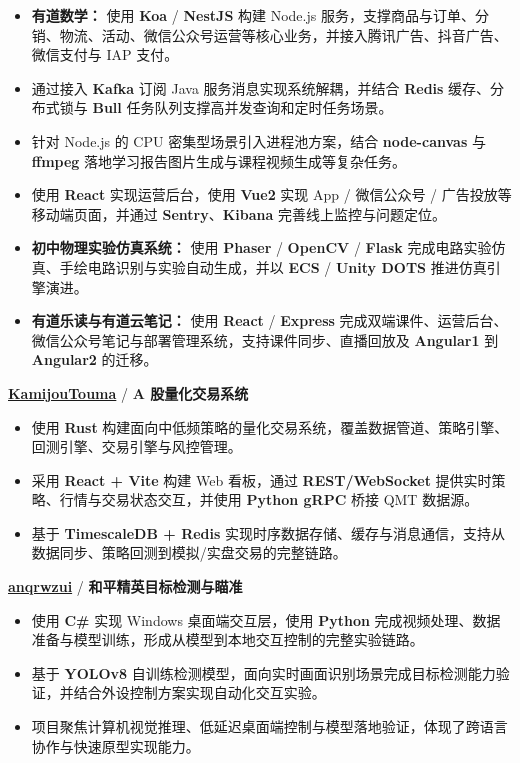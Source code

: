 \begin{itemize}
  \item \textbf{有道数学：} 使用 \textbf{Koa} / \textbf{NestJS} 构建 Node.js 服务，支撑商品与订单、分销、物流、活动、微信公众号运营等核心业务，并接入腾讯广告、抖音广告、微信支付与 IAP 支付。
  \item 通过接入 \textbf{Kafka} 订阅 Java 服务消息实现系统解耦，并结合 \textbf{Redis} 缓存、分布式锁与 \textbf{Bull} 任务队列支撑高并发查询和定时任务场景。
  \item 针对 Node.js 的 CPU 密集型场景引入进程池方案，结合 \textbf{node-canvas} 与 \textbf{ffmpeg} 落地学习报告图片生成与课程视频生成等复杂任务。
  \item 使用 \textbf{React} 实现运营后台，使用 \textbf{Vue2} 实现 App / 微信公众号 / 广告投放等移动端页面，并通过 \textbf{Sentry}、\textbf{Kibana} 完善线上监控与问题定位。
  \item \textbf{初中物理实验仿真系统：} 使用 \textbf{Phaser} / \textbf{OpenCV} / \textbf{Flask} 完成电路实验仿真、手绘电路识别与实验自动生成，并以 \textbf{ECS} / \textbf{Unity DOTS} 推进仿真引擎演进。
  \item \textbf{有道乐读与有道云笔记：} 使用 \textbf{React} / \textbf{Express} 完成双端课件、运营后台、微信公众号笔记与部署管理系统，支持课件同步、直播回放及 \textbf{Angular1} 到 \textbf{Angular2} 的迁移。
\end{itemize}


\par \textbf{\href{https://github.com/Acceyuriko/KamijouTouma}{KamijouTouma}} / \textbf{A 股量化交易系统}
\begin{itemize}
  \item 使用 \textbf{Rust} 构建面向中低频策略的量化交易系统，覆盖数据管道、策略引擎、回测引擎、交易引擎与风控管理。
  \item 采用 \textbf{React + Vite} 构建 Web 看板，通过 \textbf{REST/WebSocket} 提供实时策略、行情与交易状态交互，并使用 \textbf{Python gRPC} 桥接 QMT 数据源。
  \item 基于 \textbf{TimescaleDB + Redis} 实现时序数据存储、缓存与消息通信，支持从数据同步、策略回测到模拟/实盘交易的完整链路。
\end{itemize}

\par \textbf{\href{https://github.com/Acceyuriko/anqrwzui}{anqrwzui}} / \textbf{和平精英目标检测与瞄准}
\begin{itemize}
  \item 使用 \textbf{C\#} 实现 Windows 桌面端交互层，使用 \textbf{Python} 完成视频处理、数据准备与模型训练，形成从模型到本地交互控制的完整实验链路。
  \item 基于 \textbf{YOLOv8} 自训练检测模型，面向实时画面识别场景完成目标检测能力验证，并结合外设控制方案实现自动化交互实验。
  \item 项目聚焦计算机视觉推理、低延迟桌面端控制与模型落地验证，体现了跨语言协作与快速原型实现能力。
\end{itemize}

